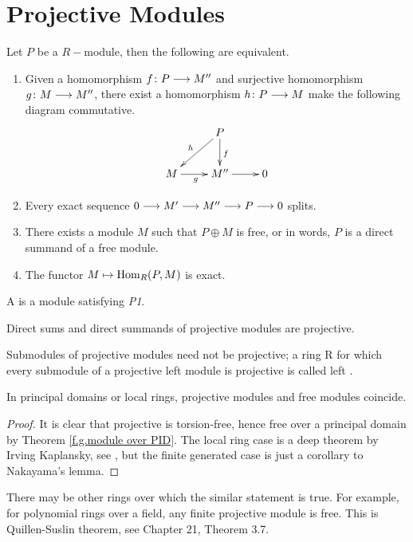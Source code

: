 \newpage\section{Projective Modules}
  \begin{prop}
    Let $P$ be a $R-$module, then the following are equivalent.
    \begin{enumerate}[P1]
      \item Given a homomorphism $f\colon P\longrightarrow M''$ and surjective homomorphism $g\colon M\longrightarrow M''$, there exist a homomorphism $h\colon P\longrightarrow M$ make the following diagram commutative.
        \begin{displaymath}
          \xymatrix{
             & P \ar[dl]_{h}\ar[d]^{f} &        \\
             M \ar[r]_{g} & M'' \ar[r] & 0             }
        \end{displaymath}
      \item Every exact sequence $0\longrightarrow M'\longrightarrow M''\longrightarrow P\longrightarrow 0$ splits.
      \item There exists a module $M$ such that $P\oplus M$ is free, or in words, $P$ is a direct summand of a free module.
      \item The functor $M\mapsto\operatorname{Hom}_R(P,M)$ is exact.
    \end{enumerate}
  \end{prop}

  \begin{defn}
    A  is a module satisfying \emph{P1}.
  \end{defn}

  \begin{prop}
    Direct sums and direct summands of projective modules are projective.
  \end{prop}
  \begin{warn}
    Submodules of projective modules need not be projective; a ring R for which every submodule of a projective left module is projective is called left .
  \end{warn}

  \begin{prop}
    In principal domains or local rings, projective modules and free modules coincide.
  \end{prop}
  \begin{proof}
    It is clear that projective is torsion-free, hence free over a principal domain by Theorem \ref{f.g.module over PID}. The local ring case is a deep theorem by Irving Kaplansky, see \cite{kaplansky1958projective}, but the finite generated case is just a corollary to Nakayama's lemma.
  \end{proof}
  \begin{rem}
    There may be other rings over which the similar statement is true. For example, for polynomial rings over a field, any finite projective module is free. This is Quillen-Suslin theorem, see Chapter 21, Theorem 3.7.
  \end{rem}

